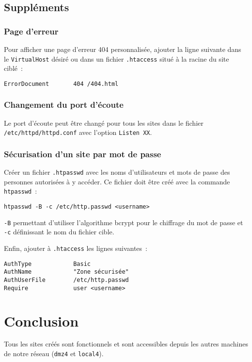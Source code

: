 \documentclass[11pt,a4paper,oneside]{article}
\newcommand{\inlinecode}{\lstinline[breaklines=true]}
\begin{document}
\subsection{Suppléments}
\subsubsection{Page d'erreur}
Pour afficher une page d'erreur 404 personnalisée, ajouter la ligne suivante
dans le \inlinecode{VirtualHost} désiré ou dans un fichier
\inlinecode{.htaccess} situé à la racine du site ciblé~:
\begin{lstlisting}
ErrorDocument       404 /404.html
\end{lstlisting}

\subsubsection{Changement du port d'écoute}
Le port d'écoute peut être changé pour tous les sites dans le fichier
\inlinecode{/etc/httpd/httpd.conf} avec l'option \inlinecode{Listen XX}.

\subsubsection{Sécurisation d'un site par mot de passe}
Créer un fichier \inlinecode{.htpasswd} avec les noms d'utilisateurs et mots de passe
des personnes autorisées à y accéder. Ce fichier doit être créé avec la commande
\inlinecode{htpasswd}~:
\begin{lstlisting}
htpasswd -B -c /etc/http.passwd <username>
\end{lstlisting}
\inlinecode{-B} permettant d'utiliser l'algorithme bcrypt pour le chiffrage du mot de
passe et \inlinecode{-c} définissant le nom du fichier cible.

Enfin, ajouter à \inlinecode{.htaccess} les lignes suivantes~:
\begin{lstlisting}
AuthType            Basic
AuthName            "Zone sécurisée"
AuthUserFile        /etc/http.passwd
Require             user <username>
\end{lstlisting}

\section{Conclusion}

Tous les sites créés sont fonctionnels et sont accessibles depuis les autres
machines de notre réseau (\inlinecode{dmz4} et \inlinecode{local4}).
\end{document}
